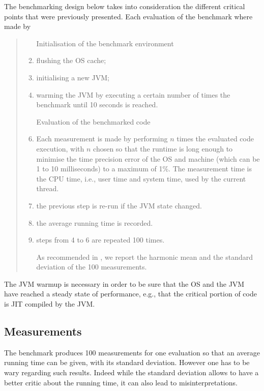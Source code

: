 The benchmarking design below takes into consideration the different critical
points that were previously presented. Each evaluation of the benchmark where
made by
\begin{quote}
\begin{enumerate}
  \item[Initialisation of the benchmark environment]
  \item flushing the OS cache;
  \item initialising a new JVM; 
  \item warming the JVM by executing a certain number of times the benchmark
  until 10 seconds is reached.

  \item[Evaluation of the benchmarked code]
  \item Each measurement is made by performing $n$ times the evaluated code
  execution, with $n$ chosen so that the runtime is long enough to minimise the
  time precision error of the OS and machine (which can be 1 to 10
  milliseconds) to a maximum of 1\%. The measurement time is the CPU time,
  i.e., user time and system time, used by the current thread.
  \item the previous step is re-run if the JVM state changed.
  \item the average running time is recorded.

  \item steps from 4 to 6 are repeated 100 times.
  \item[] As recommended in \cite{lilja:2000:book}, we report the harmonic mean
  and the standard deviation of the 100 measurements.
\end{enumerate}
\end{quote}
The JVM warmup is necessary in order to be sure that the OS and the JVM have
reached a steady state of performance, e.g., that the critical portion of code
is JIT compiled by the JVM.

\subsection{Measurements}

The benchmark produces 100 measurements for one evaluation so that an average
running time can be given, with its standard deviation. However one has to be
wary regarding such results. Indeed while the standard deviation allows to have
a better critic about the running time, it can also lead to misinterpretations.

